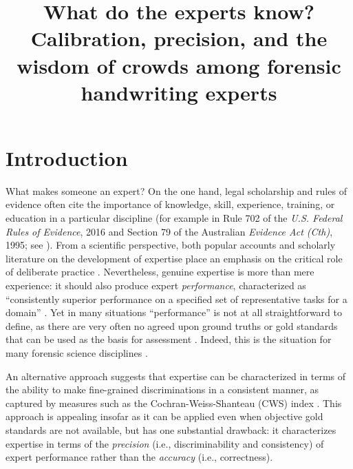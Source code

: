 \documentclass[doc]{apa6} %
\title{What do the experts know? Calibration, precision, and the wisdom of crowds among forensic handwriting experts}
\begin{document}
	\maketitle
	\noindent

\section{Introduction}

What makes someone an expert? On the one hand, legal scholarship and rules of evidence often cite the importance of knowledge, skill, experience, training, or education in a particular discipline (for example in Rule 702 of the {\it U.S. Federal Rules of Evidence}, 2016 and Section 79 of the Australian {\it Evidence Act (Cth)}, 1995; see ). From a scientific perspective, both popular accounts \cite{gladwell2008outliers,ericsson2016peak} and scholarly literature on the development of expertise place an emphasis on the critical role of deliberate practice \cite{ericsson1993role}. Nevertheless, genuine expertise is more than mere experience: it should also produce expert {\it performance}, characterized as ``consistently superior performance on a specified set of representative tasks for a domain'' \cite[p. 277]{ericsson1996expert}. Yet in many situations ``performance'' is not at all straightforward to define, as there are very often no agreed upon ground truths or gold standards that can be used as the basis for assessment \cite{weiss2006people}. Indeed, this is the situation for many forensic science disciplines \cite{taroni2001finetti}.

An alternative approach suggests that expertise can be characterized in terms of the ability to make fine-grained discriminations in a consistent manner, as captured by measures such as the Cochran-Weiss-Shanteau (CWS) index \cite{weiss2003empirical}. This approach is appealing insofar as it can be applied even when objective gold standards are not available, but has one substantial drawback: it characterizes expertise in terms of the {\it precision} (i.e., discriminability and consistency) of expert performance rather than the {\it accuracy} (i.e., correctness).
\end{document}

